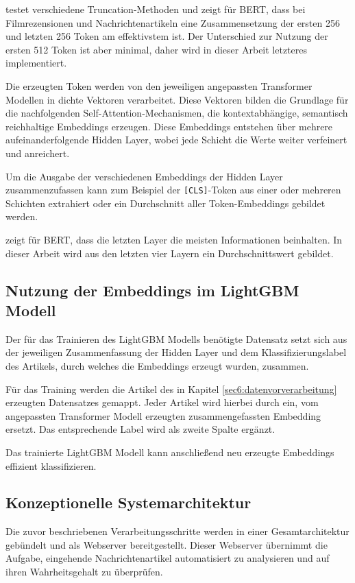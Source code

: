 \cite{sun2020finetuneberttextclassification} testet verschiedene Truncation-Methoden und zeigt für BERT, dass bei Filmrezensionen und Nachrichtenartikeln eine 
Zusammensetzung der ersten 256 und letzten 256 Token am effektivstem ist. Der Unterschied zur Nutzung der ersten 512 Token ist aber minimal, daher wird in dieser Arbeit letzteres
implementiert.

Die erzeugten Token werden von den jeweiligen angepassten Transformer Modellen in dichte Vektoren verarbeitet.
Diese Vektoren bilden die Grundlage für die nachfolgenden Self-Attention-Mechanismen, die kontextabhängige, semantisch reichhaltige Embeddings erzeugen.
Diese Embeddings entstehen über mehrere aufeinanderfolgende Hidden Layer, wobei jede Schicht die Werte weiter verfeinert und anreichert.

Um die Ausgabe der verschiedenen Embeddings der Hidden Layer zusammenzufassen kann zum Beispiel der \texttt{[CLS]}-Token aus einer oder mehreren Schichten extrahiert oder 
ein Durchschnitt aller Token-Embeddings gebildet werden.

\cite{sun2020finetuneberttextclassification} zeigt für BERT, dass die letzten Layer die meisten Informationen beinhalten.
In dieser Arbeit wird aus den letzten vier Layern ein Durchschnittswert gebildet.

\subsection{Nutzung der Embeddings im LightGBM Modell}

Der für das Trainieren des LightGBM Modells benötigte Datensatz setzt sich aus der jeweiligen Zusammenfassung der Hidden Layer und dem Klassifizierungslabel 
des Artikels, durch welches die Embeddings erzeugt wurden, zusammen. 

Für das Training werden die Artikel des in Kapitel \ref{sec6:datenvorverarbeitung} erzeugten Datensatzes gemappt. 
Jeder Artikel wird hierbei durch ein, vom angepassten Transformer Modell erzeugten zusammengefassten Embedding ersetzt.
Das entsprechende Label wird als zweite Spalte ergänzt.

Das trainierte LightGBM Modell kann anschließend neu erzeugte Embeddings effizient klassifizieren.

\subsection{Konzeptionelle Systemarchitektur}

Die zuvor beschriebenen Verarbeitungsschritte werden in einer Gesamtarchitektur gebündelt und als Webserver bereitgestellt. 
Dieser Webserver übernimmt die Aufgabe, eingehende Nachrichtenartikel automatisiert zu analysieren und auf ihren Wahrheitsgehalt zu überprüfen.

